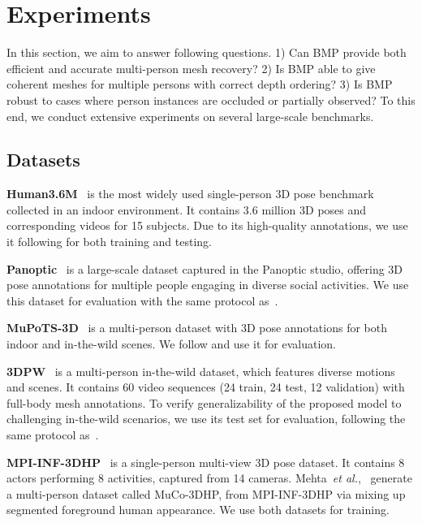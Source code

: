\documentclass[final]{cvpr}
\newcommand{\et}{\emph{et al.}}
\newcommand{\myparagraph}[1]{{ \noindent \bf #1}}
\begin{document}
\section{Experiments}
In this section, we aim to answer following questions.
1) Can BMP provide both efficient and accurate 
multi-person mesh recovery?
2) Is BMP able to give coherent meshes for multiple persons with correct depth ordering?
3) Is BMP robust to cases where person instances are occluded or partially observed?
To this end, we conduct extensive experiments on several large-scale benchmarks.

\subsection{Datasets} \label{sec:datasets}

\myparagraph{Human3.6M}~\cite{ionescu2014human3} is the most widely used single-person 3D pose benchmark collected in an indoor environment.
It contains 3.6 million 3D poses and corresponding videos for 15 subjects. 
Due to its high-quality annotations, we use it following \cite{jiang2020coherent} for both training and testing.


\myparagraph{Panoptic}~\cite{joo2015panoptic} is a large-scale dataset captured in the Panoptic studio, offering 3D pose annotations for multiple people engaging in diverse social activities. 
We use this dataset for evaluation with the same protocol as~\cite{zanfir2018monocular}.


\myparagraph{MuPoTS-3D}~\cite{singleshotmultiperson2018} 
is a multi-person dataset with 3D pose annotations for both indoor and in-the-wild scenes.
We follow \cite{singleshotmultiperson2018} and use it for evaluation.


\myparagraph{3DPW}~\cite{vonMarcard2018} is a multi-person in-the-wild dataset, which features diverse motions and scenes. It contains 60 video sequences (24 train, 24 test, 12 validation) with full-body mesh annotations.
To verify generalizability of the proposed model to challenging in-the-wild scenarios, we use its test set for evaluation, following the same protocol as~\cite{kocabas2020vibe}.


\myparagraph{MPI-INF-3DHP}~\cite{mehta2017vnect} is a single-person multi-view 3D pose dataset. It contains 8 actors performing 8 activities, captured from 14 cameras. Mehta~\et,~\cite{singleshotmultiperson2018} generate a multi-person dataset called MuCo-3DHP, from MPI-INF-3DHP via mixing up segmented foreground human appearance. We use both datasets for training.
\end{document}
